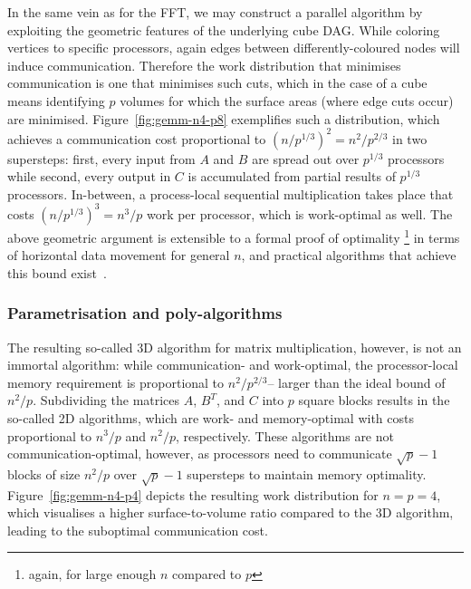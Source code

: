 \documentclass[oneside,reqno, a4paper]{amsart}
\numberwithin{equation}{section}
\begin{document}
In the same vein as for the FFT,
we may construct a parallel algorithm by exploiting the geometric features of the underlying cube DAG.
While coloring vertices to specific processors, again edges between differently-coloured nodes will induce communication.
Therefore the work distribution that minimises communication is one that minimises such cuts,
which in the case of a cube means identifying $p$ volumes for which the surface areas (where edge cuts occur) are minimised.
Figure~\ref{fig:gemm-n4-p8} exemplifies such a distribution,
which achieves a communication cost proportional to $(n/p^{1/3})^2=n^2/p^{2/3}$ in two supersteps:
first, every input from $A$ and $B$ are spread out over $p^{1/3}$ processors while
second, every output in $C$ is accumulated from partial results of $p^{1/3}$ processors.
In-between, a process-local sequential multiplication takes place that costs $(n/p^{1/3})^3=n^3/p$ work per processor,
which is work-optimal as well.
The above geometric argument is extensible to a formal proof of optimality%
\footnote{again, for large enough $n$ compared to $p$}
in terms of horizontal data movement for general $n$,
and practical algorithms that achieve this bound exist~\cite{dekel81,bernsten89,aggarwal90,mccoll99,irony04}.

\subsubsection*{Parametrisation and poly-algorithms} The resulting so-called 3D algorithm for matrix multiplication, however, is not an immortal algorithm:
while communication- and work-optimal, the processor-local memory requirement is proportional to $n^2/p^{2/3}$--
larger than the ideal bound of $n^2/p$.
Subdividing the matrices $A$, $B^T$, and $C$ into $p$ square blocks results in the so-called 2D algorithms,
which are work- and memory-optimal with costs proportional to $n^3/p$ and $n^2/p$, respectively.
These algorithms are not communication-optimal, however,
as processors need to communicate $\sqrt{p}-1$ blocks of size $n^2/p$ over $\sqrt{p}-1$ supersteps to maintain memory optimality.
Figure~\ref{fig:gemm-n4-p4} depicts the resulting work distribution for $n=p=4$,
which visualises a higher surface-to-volume ratio compared to the 3D algorithm,
leading to the suboptimal communication cost.
\end{document}
